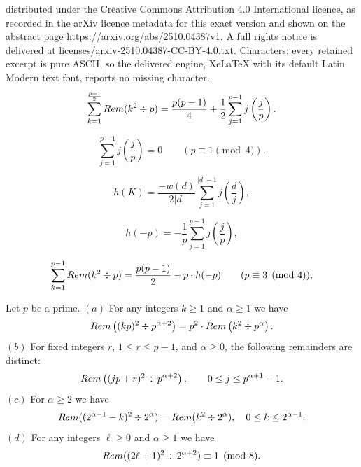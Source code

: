 \documentclass[10pt,a4paper]{amsart}
\begin{document}
distributed under the Creative Commons Attribution 4.0 International licence, as recorded in the arXiv licence metadata for this exact version and shown on the abstract page https://arxiv.org/abs/2510.04387v1. A full rights notice is delivered at licenses/arxiv-2510.04387-CC-BY-4.0.txt. Characters: every retained excerpt is pure ASCII, so the delivered engine, XeLaTeX with its default Latin Modern text font, reports no missing character.
\begin{equation}\label{2.24}
\sum_{k=1}^{\frac{p-1}{2}}{\rm Rem}(k^2\div p) = \frac{p(p-1)}{4}
+\frac{1}{2}\sum_{j=1}^{p-1}j\left(\frac{j}{p}\right).
\end{equation}

\begin{equation}\label{2.25}
\sum_{j=1}^{p-1}j\left(\frac{j}{p}\right)=0\qquad (p\equiv 1\pmod{4}).
\end{equation}

\begin{equation}\label{3.2}
h(K)=\frac{-w(d)}{2|d|}\sum_{j=1}^{|d|-1}j\left(\frac{d}{j}\right),
\end{equation}

\begin{equation}\label{3.7}
h(-p)=-\frac{1}{p}\sum_{j=1}^{p-1}j\left(\frac{j}{p}\right),
\end{equation}

\begin{equation}\label{4.11}
\sum_{k=1}^{p-1}{\rm Rem}(k^2\div p) = \frac{p(p-1)}{2}
-p\cdot h(-p)\qquad (p\equiv 3\pmod{4}),
\end{equation}

\begin{lemma}\label{lem:6.3}
Let $p$ be a prime. $(a)$ For any integers $k\geq 1$ and $\alpha\geq 1$ we have
\begin{equation}\label{6.12}
{\rm Rem}\left((kp)^2\div p^{\alpha+2}\right)
=p^2\cdot{\rm Rem}\left(k^2\div p^{\alpha}\right).
\end{equation}
$(b)$ For fixed integers $r$, $1\leq r\leq p-1$, and $\alpha\geq 0$, the 
following remainders are distinct:
\begin{equation}\label{6.13}
{\rm Rem}\left((jp+r)^2\div p^{\alpha+2}\right),\qquad
0\leq j\leq p^{\alpha+1}-1.
\end{equation}
$(c)$ For $\alpha\geq 2$ we have
\begin{equation}\label{6.14}
{\rm Rem}((2^{\alpha-1}-k)^2\div 2^\alpha)={\rm Rem}(k^2\div 2^\alpha),\quad
0\leq k\leq 2^{\alpha-1}.
\end{equation}
$(d)$ For any integers $\ell\geq 0$ and $\alpha\geq 1$ we have
\begin{equation}\label{6.15}
{\rm Rem}((2\ell+1)^2\div 2^{\alpha+2})\equiv 1\pmod{8}.
\end{equation}
\end{lemma}
\end{document}
